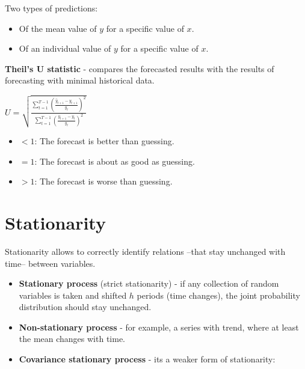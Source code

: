 \documentclass[10pt, a4paper, landscape]{article}
\newcommand{\E}{\mathrm{E}}
\begin{document}
\begin{multicols}{3}
		Two types of predictions:
		
		\begin{itemize}[leftmargin=*]
			\item Of the mean value of $y$ for a specific value of $x$.
			\item Of an individual value of $y$ for a specific value of $x$.
		\end{itemize}
		
		\textbf{Theil's U statistic} - compares the forecasted results with the results of forecasting with minimal historical data.
		
		\begin{center}
			$U = \sqrt{\frac{\sum_{t=1}^{T-1} \left( \frac{\hat{y}_{t+1} - y_{t+1}}{y_t} \right)^2}{\sum_{t=1}^{T-1} \left( \frac{y_{t+1} - y_t}{y_t} \right)^2}}$
		\end{center}
		
		\begin{itemize}[leftmargin=*]
			\item $< 1$: The forecast is better than guessing.
			\item $= 1$: The forecast is about as good as guessing.
			\item $> 1$: The forecast is worse than guessing.
		\end{itemize}
		
		\columnbreak
		
		\section*{Stationarity}
		
		Stationarity allows to correctly identify relations --that stay unchanged with time-- between variables.
		
		\begin{itemize}[leftmargin=*]
			\item \textbf{Stationary process} (strict stationarity) - if any collection of random variables is taken and shifted $h$ periods (time changes), the joint probability distribution should stay unchanged.
			\item \textbf{Non-stationary process} - for example, a series with trend, where at least the mean changes with time.
			\item \textbf{Covariance stationary process} - its a weaker form of stationarity:
			
			\begin{itemize}[leftmargin=*]
\end{itemize}
\end{itemize}
\end{multicols}
\end{document}
